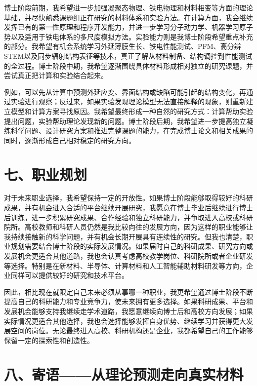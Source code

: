 博士阶段前期，我希望进一步加强凝聚态物理、铁电物理和材料相变等方面的理论基础，并尽快熟悉课题组正在研究的材料体系和实验方法。在计算方面，我会继续发挥已有的第一性原理和程序开发能力，并进一步学习分子动力学、机器学习原子势以及适用于铁电体系的多尺度模拟方法。实验能力则是我博士阶段希望重点补充的部分。我希望有机会系统学习外延薄膜生长、铁电性能测试、PFM、高分辨STEM以及同步辐射结构表征等技术，真正了解从材料制备、结构调控到性能测试的全过程。博士阶段中期，我希望逐渐围绕具体材料形成相对独立的研究课题，并尝试真正把计算和实验结合起来。

例如，可以先从计算中预测外延应变、界面结构或缺陷可能引起的结构变化，再通过实验进行观察；反过来，如果实验发现理论模型无法直接解释的现象，则重新建立模型和计算方案寻找原因。我希望最终形成一种自然的研究方式：计算帮助实验提出问题，实验帮助理论发现新的问题。博士阶段后期，我希望进一步提高独立凝练科学问题、设计研究方案和推进完整课题的能力，在完成博士论文和相关成果的同时，逐渐形成自己相对稳定的研究方向。

\section{七、职业规划}

对于未来职业选择，我希望保持一定的开放性。如果博士阶段能够取得较好的科研成果，并有机会进入合适的平台继续开展研究，我愿意在博士毕业后继续进行博士后训练，进一步积累研究成果、合作经验和独立科研能力，并争取进入高校或科研院所。高校教师和科研人员仍然是我比较向往的发展方向，因为这样的职业能够让我持续接触新的科学问题，并有机会长期开展具有连续性的研究。但我也清楚，职业规划需要结合博士阶段的实际发展情况。如果届时自己的科研成果、研究方向或发展机会更适合其他道路，我也会认真考虑高校教学岗位、科研院所或者企业研发等选择。特别是在新材料、半导体、计算材料和人工智能辅助材料研发等方向，企业同样可以提供较好的研究和技术平台。

因此，相比现在就限定自己未来必须从事哪一种职业，我更希望通过博士阶段不断提高自己的科研能力和专业竞争力，使未来拥有更多选择。如果科研成果、平台和发展机会能够支持我继续走学术道路，我愿意继续向博士后和高校方向发展；如果实际情况更适合其他选择，我也会选择能够发挥自身优势、继续学习并获得更大发展空间的岗位。无论最终进入高校、科研机构还是企业，我都希望自己的工作能够保留一定的探索性和创造性。

\section{八、寄语——从理论预测走向真实材料}

